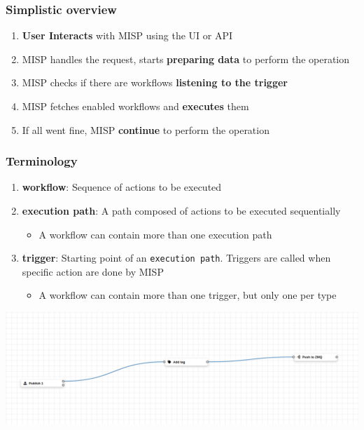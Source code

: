 \begin{frame}
    \frametitle{Simplistic overview}
    \begin{enumerate}
        \item \textbf{User Interacts} with MISP using the UI or API
        \item MISP handles the request, starts \textbf{preparing data} to perform the operation
        \item MISP checks if there are workflows \textbf{listening to the trigger}
        \item MISP fetches enabled workflows and \textbf{executes} them
        \item If all went fine, MISP \textbf{continue} to perform the operation
    \end{enumerate}
\end{frame}

\begin{frame}
    \frametitle{Terminology}
    \begin{enumerate}
        \item \textbf{workflow}: Sequence of actions to be executed
        \item \textbf{execution path}: A path composed of actions to be executed sequentially
        \begin{itemize}
            \item A workflow can contain more than one execution path
        \end{itemize}
        \item \textbf{trigger}: Starting point of an \texttt{execution path}. Triggers are called when specific action are done by MISP
        \begin{itemize}
            \item A workflow can contain more than one trigger, but only one per type
        \end{itemize}
    \end{enumerate}
    \begin{center}
        \includegraphics[width=1.0\linewidth]{pictures/workflow-view.png}
    \end{center}
\end{frame}

